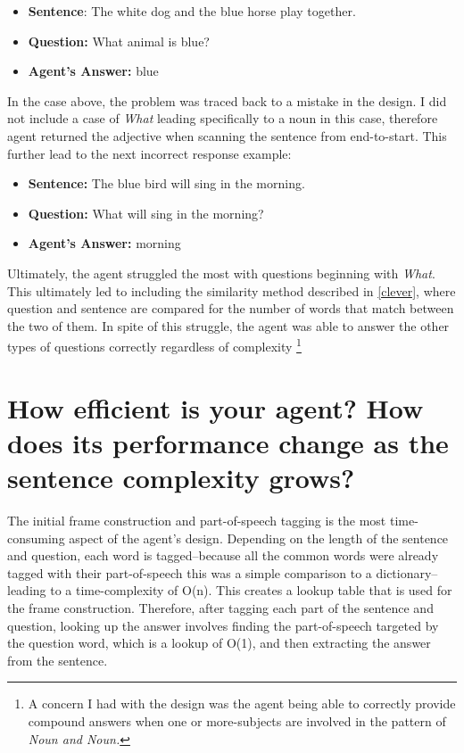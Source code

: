 \documentclass[
	letterpaper, %
]{jdf}
\begin{document}
\begin{itemize}
	\item \textbf{Sentence}: The white dog and the blue horse play together.
	\item \textbf{Question:} What animal is blue?
	\item \textbf{Agent's Answer:} blue
\end{itemize}
In the case above, the problem was traced back to a mistake in the design. I did not include a case of \textit{What} leading specifically to a noun in this case, therefore agent returned the adjective when scanning the sentence from end-to-start. This further lead to the next incorrect response example:
\begin{itemize}
\item \textbf{Sentence:} The blue bird will sing in the morning.
\item \textbf{Question:} What will sing in the morning?
\item \textbf{Agent's Answer:} morning
\end{itemize}
Ultimately, the agent struggled the most with questions beginning with \textit{What}. This ultimately led to including the similarity method described in \ref{clever}, where question and sentence are compared for the number of words that match between the two of them. In spite of this struggle, the agent was able to answer the other types of questions correctly regardless of complexity \footnote{A concern I had with the design was the agent being able to correctly provide compound answers when one or more-subjects are involved in the pattern of \textit{Noun and Noun.}}

\section{How efficient is your agent? How does its performance change as the sentence complexity grows?}
The initial frame construction and part-of-speech tagging is the most time-consuming aspect of the agent's design. Depending on the length of the sentence and question, each word is tagged--because all the common words were already tagged with their part-of-speech this was a simple comparison to a dictionary--leading to a time-complexity of O(n).  This creates a lookup table that is used for the frame construction. Therefore, after tagging each part of the sentence and question, looking up the answer involves finding the part-of-speech targeted by the question word, which is a lookup of O(1), and then extracting the answer from the sentence.
\end{document}
